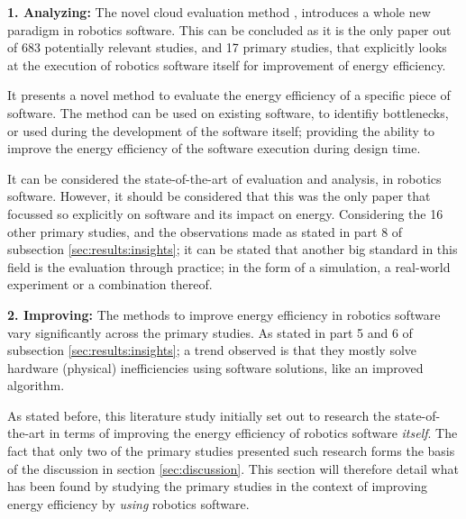\vspace{5mm}

\noindent\textbf{1. Analyzing:}
The novel cloud evaluation method \cite{hou2017novel_cloud_evaluation_model}, introduces a whole new paradigm in robotics software.
This can be concluded as it is the only paper out of 683 potentially relevant studies, and 17 primary studies, 
that explicitly looks at the execution of robotics software itself for improvement of energy efficiency.

It presents a novel method to evaluate the energy efficiency of a specific piece of software.
The method can be used on existing software, to identifiy bottlenecks, or used during the development of the software itself;
providing the ability to improve the energy efficiency of the software execution during design time.

It can be considered the state-of-the-art of evaluation and analysis, in robotics software.
However, it should be considered that this was the only paper that focussed so explicitly on software and its impact on energy.
Considering the 16 other primary studies, and the observations made as stated in part 8 of subsection \ref{sec:results:insights}; 
it can be stated that another big standard in this field is the evaluation through practice; 
in the form of a simulation, a real-world experiment or a combination thereof.

\vspace{5mm}

\noindent\textbf{2. Improving:}
The methods to improve energy efficiency in robotics software vary significantly across the primary studies. 
As stated in part 5 and 6 of subsection \ref{sec:results:insights}; a trend observed is that they mostly solve hardware (physical) 
inefficiencies using software solutions, like an improved algorithm.

\vspace{2mm}

As stated before, this literature study initially set out to research the state-of-the-art in terms of improving the
energy efficiency of robotics software \textit{itself}.
The fact that only two of the primary studies presented such research forms the basis of the discussion in section \ref{sec:discussion}. 
This section will therefore detail what has been found by studying the primary studies in the context of improving energy efficiency 
by \textit{using} robotics software.

\vspace{2mm}

